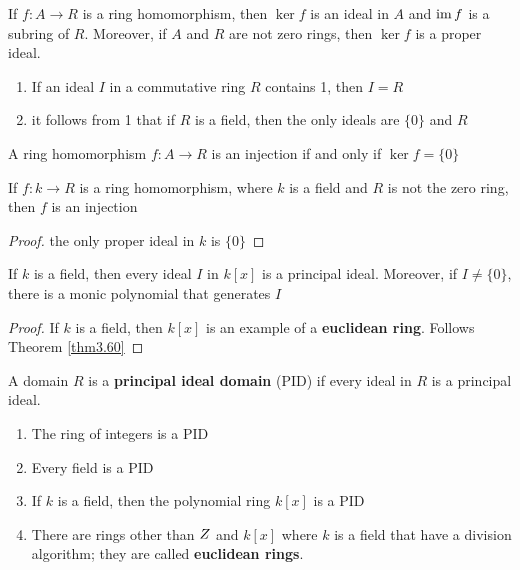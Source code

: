 \documentclass[11pt]{article}
\begin{document}
\begin{proposition}[]
If \(f:A\to R\) is a ring homomorphism, then \(\ker f\) is an ideal in \(A\)
and \(\operatorname{im} f\) is a subring of \(R\). Moreover, if \(A\) and \(R\) are not zero rings,
then \(\ker f\) is a proper ideal.
\end{proposition}

\begin{examplle}[]
\begin{enumerate}
\item If an ideal \(I\) in a commutative ring \(R\) contains 1, then \(I=R\)
\item it follows from 1 that if \(R\) is a field, then the only ideals are \(\{0\}\)
and \(R\)
\end{enumerate}
\end{examplle}

\begin{proposition}[]
A ring homomorphism \(f:A \to R\) is an injection if and only if \(\ker f=\{0\}\)
\end{proposition}

\begin{corollary}[]
\label{ncor2.32}
If \(f:k\to R\) is a ring homomorphism, where \(k\) is a field and \(R\) is not the
zero ring, then \(f\) is an injection
\end{corollary}

\begin{proof}
the only proper ideal in \(k\) is \(\{0\}\)
\end{proof}

\begin{theorem}[]
\label{thm3.54}
If \(k\) is a field, then every ideal \(I\) in \(k[x]\) is a principal ideal.
Moreover, if \(I\neq\{0\}\), there is a monic polynomial that generates \(I\)
\end{theorem}

\begin{proof}
If \(k\) is a field, then \(k[x]\) is an example of a \textbf{euclidean ring}. Follows
Theorem \ref{thm3.60}
\end{proof}


\begin{definition}[]
A domain \(R\) is a \textbf{principal ideal domain} (PID) if every ideal in \(R\) is a principal
ideal. 
\end{definition}

\begin{examplle}[]
\begin{enumerate}
\item The ring of integers is a PID
\item Every field is a PID
\item If \(k\) is a field, then the polynomial ring \(k[x]\) is a PID
\item There are rings other than \(\relax{Z}\) and \(k[x]\) where \(k\) is a field that
have a division algorithm; they are called \textbf{euclidean rings}.
\end{enumerate}
\end{examplle}
\end{document}
